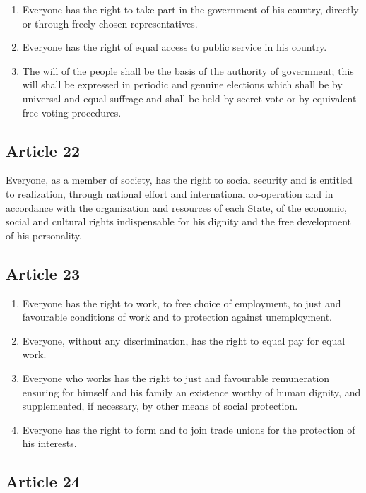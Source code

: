 \documentclass[
  titlepage,
  openright,
  DIV=calc,
  toc=listof,
  listof=nochaptergap]{scrbook}
\begin{document}
\begin{enumerate}
\def\labelenumi{\arabic{enumi}.}
\item
  Everyone has the right to take part in the government of his country,
  directly or through freely chosen representatives.
\item
  Everyone has the right of equal access to public service in his
  country.
\item
  The will of the people shall be the basis of the authority of
  government; this will shall be expressed in periodic and genuine
  elections which shall be by universal and equal suffrage and shall be
  held by secret vote or by equivalent free voting procedures.
\end{enumerate}

\subsection{Article 22}\label{article-22-3}

Everyone, as a member of society, has the right to social security and
is entitled to realization, through national effort and international
co-operation and in accordance with the organization and resources of
each State, of the economic, social and cultural rights indispensable
for his dignity and the free development of his personality.

\subsection{Article 23}\label{article-23-3}

\begin{enumerate}
\def\labelenumi{\arabic{enumi}.}
\item
  Everyone has the right to work, to free choice of employment, to just
  and favourable conditions of work and to protection against
  unemployment.
\item
  Everyone, without any discrimination, has the right to equal pay for
  equal work.
\item
  Everyone who works has the right to just and favourable remuneration
  ensuring for himself and his family an existence worthy of human
  dignity, and supplemented, if necessary, by other means of social
  protection.
\item
  Everyone has the right to form and to join trade unions for the
  protection of his interests.
\end{enumerate}

\subsection{Article 24}\label{article-24-3}
\end{document}
